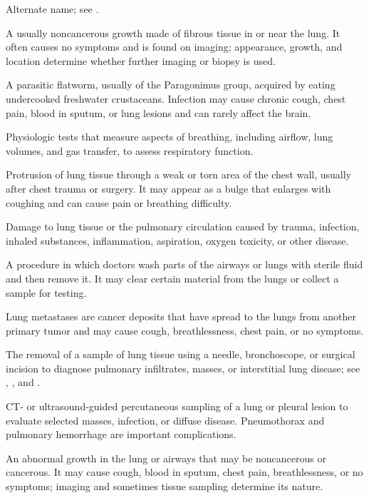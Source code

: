  Alternate name; see .

 A usually noncancerous growth made of fibrous tissue in or near the lung. It often causes no symptoms and is found on imaging; appearance, growth, and location determine whether further imaging or biopsy is used.

 A parasitic flatworm, usually of the Paragonimus group, acquired by eating undercooked freshwater crustaceans. Infection may cause chronic cough, chest pain, blood in sputum, or lung lesions and can rarely affect the brain.

 Physiologic tests that measure aspects of breathing, including airflow, lung volumes, and gas transfer, to assess respiratory function.

 Protrusion of lung tissue through a weak or torn area of the chest wall, usually after chest trauma or surgery. It may appear as a bulge that enlarges with coughing and can cause pain or breathing difficulty.

 Damage to lung tissue or the pulmonary circulation caused by trauma, infection, inhaled substances, inflammation, aspiration, oxygen toxicity, or other disease.

 A procedure in which doctors wash parts of the airways or lungs with sterile fluid and then remove it. It may clear certain material from the lungs or collect a sample for testing.

 Lung metastases are cancer deposits that have spread to the lungs from another primary tumor and may cause cough, breathlessness, chest pain, or no symptoms.

 The removal of a sample of lung tissue using a needle, bronchoscope, or surgical incision to diagnose pulmonary infiltrates, masses, or interstitial lung disease; see , , and .

 CT- or ultrasound-guided percutaneous sampling of a lung or pleural lesion to evaluate selected masses, infection, or diffuse disease. Pneumothorax and pulmonary hemorrhage are important complications.

 An abnormal growth in the lung or airways that may be noncancerous or cancerous. It may cause cough, blood in sputum, chest pain, breathlessness, or no symptoms; imaging and sometimes tissue sampling determine its nature.

